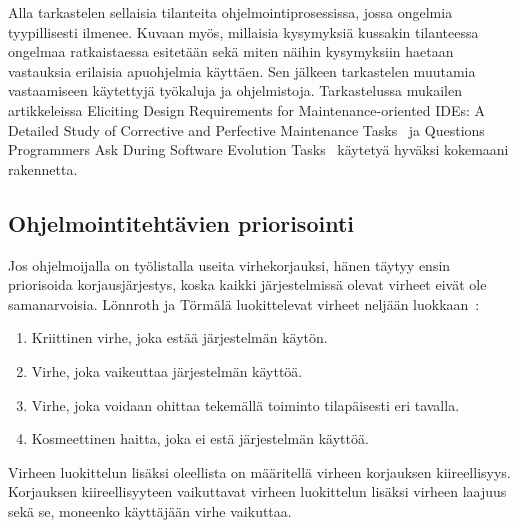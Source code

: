 \documentclass[finnish]{tktltiki2}
\theoremstyle{definition}
\theoremstyle{remark}
\begin{document}
Alla tarkastelen sellaisia tilanteita ohjelmointiprosessissa, jossa ongelmia tyypillisesti ilmenee. Kuvaan myös, millaisia kysymyksiä kussakin tilanteessa ongelmaa ratkaistaessa esitetään sekä miten näihin kysymyksiin haetaan vastauksia erilaisia apuohjelmia käyttäen. Sen jälkeen tarkastelen muutamia vastaamiseen käytettyjä työkaluja ja ohjelmistoja. Tarkastelussa mukailen artikkeleissa Eliciting Design Requirements for Maintenance-oriented IDEs: A Detailed Study of Corrective and Perfective Maintenance Tasks~\cite{eliciting-design-requirements-for-maintenance-oriented-ides} ja Questions Programmers Ask During Software Evolution Tasks~\cite{questions-during-software-evolution-tasks} käytetyä hyväksi kokemaani rakennetta.

\subsection{Ohjelmointitehtävien priorisointi}

Jos ohjelmoijalla on työlistalla useita virhekorjauksi, hänen täytyy ensin priorisoida korjausjärjestys, koska kaikki järjestelmissä olevat virheet eivät ole samanarvoisia. Lönnroth ja Törmälä luokittelevat virheet neljään luokkaan~\cite{testaus-kriittisyys}:
\begin{enumerate}
  \item Kriittinen virhe, joka estää järjestelmän käytön.
  \item Virhe, joka vaikeuttaa järjestelmän käyttöä.
  \item Virhe, joka voidaan ohittaa tekemällä toiminto tilapäisesti eri tavalla.
  \item Kosmeettinen haitta, joka ei estä järjestelmän käyttöä.
\end{enumerate}

Virheen luokittelun lisäksi oleellista on määritellä virheen korjauksen kiireellisyys. Korjauksen kiireellisyyteen vaikuttavat virheen luokittelun lisäksi virheen laajuus sekä se, moneenko käyttäjään virhe vaikuttaa.

\end{document}
